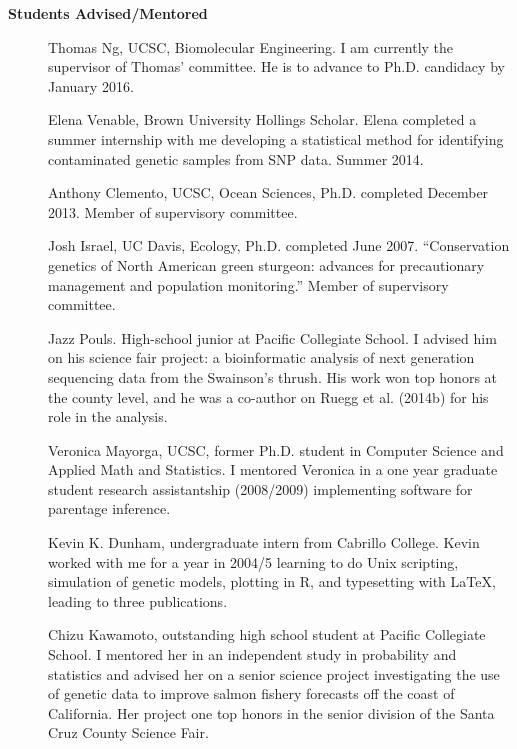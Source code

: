 \documentclass[11pt]{article}
\newlength{\postskip}
\begin{document}
{\bf Students Advised/Mentored}
\begin{description}
\item[] Thomas Ng, UCSC, Biomolecular Engineering.  I am currently the supervisor of Thomas' committee.  He is to
advance to Ph.D. candidacy by January 2016.
\item[] Elena Venable, Brown University Hollings Scholar.  Elena completed a summer internship with me developing 
a statistical method for identifying contaminated genetic samples from SNP data. Summer 2014.
\item[] Anthony Clemento, UCSC, Ocean Sciences, Ph.D. completed December 2013.  Member of supervisory committee.
\item[] Josh Israel, UC Davis, Ecology,  Ph.D. completed June 2007. ``Conservation genetics of North American green sturgeon: advances for precautionary management and population monitoring.'' Member of supervisory committee.
\item[] Jazz Pouls.  High-school junior at Pacific Collegiate School.  I advised him on his science fair project:
a bioinformatic analysis of next generation sequencing data from the Swainson's thrush.  His work won top honors
at the county level, and he was a co-author on Ruegg et al. (2014b) for his role in the analysis.
\item[] Veronica Mayorga, UCSC,  former Ph.D. student in Computer Science and Applied Math and Statistics. I mentored Veronica in a one year graduate student research assistantship (2008/2009) implementing software for parentage inference.
\item[] Kevin K. Dunham,  undergraduate intern from Cabrillo College.  Kevin worked with me for a year in 2004/5 learning to do Unix scripting, simulation of genetic models, plotting in R, and typesetting with \LaTeX{}, leading to three publications. 
\item[] Chizu Kawamoto, outstanding high school student at Pacific Collegiate School.  I mentored her in an independent study in probability and statistics and advised her on a senior science project investigating the use of genetic data to improve salmon fishery forecasts off the coast of California.  Her project one top honors in the senior division of the Santa Cruz County Science Fair.

\end{description}
\vspace*{\postskip}


\nocite{*}
\end{document}
